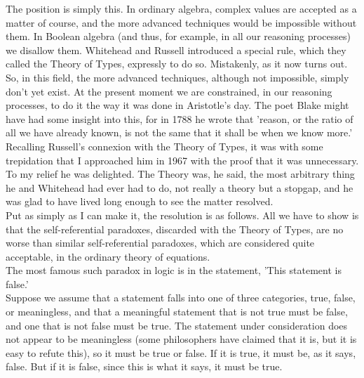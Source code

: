 \documentclass[a4paper]{article}
\theoremstyle{remark}
\begin{document}
The  position   is  simply  this.  In  ordinary   algebra,   complex   values  are  accepted  as  a  matter  of  course,  and  the  more  advanced   techniques   would   be   impossible   without   them.    In    Boolean  algebra  (and  thus,  for  example,  in  all  our  reasoning  processes)   we  disallow   them.   Whitehead   and   Russell   introduced  a  special  rule,  which  they  called  the  Theory  of  Types,  expressly  to  do  so.  Mistakenly,  as  it  now  turns  out.  So,  in  this  field,  the  more  advanced  techniques,  although  not  impossible,  simply  don't   yet  exist.  At  the  present   moment  we   are   constrained,  in  our  reasoning  processes,  to  do  it  the  way  it  was  done  in  Aristotle's  day.  The  poet  Blake  might  have  had  some  insight  into  this,  for  in  1788  he  wrote  that  'reason,  or  the  ratio  of  all  we  have  already  known,  is  not  the  same  that  it  shall  be  when  we  know  more.'\\

Recalling  Russell's  connexion  with  the  Theory  of  Types,  it was  with  some  trepidation   that   I  approached   him   in   1967   with  the  proof  that  it  was  unnecessary.  To  my  relief   he  was  delighted.  The  Theory  was,  he  said,  the  most  arbitrary  thing  he  and  Whitehead  had  ever  had  to  do,  not  really  a  theory  but  a  stopgap,  and  he  was  glad  to  have  lived  long  enough  to  see  the  matter  resolved.\\

Put  as  simply  as  I  can  make  it,  the  resolution  is  as  follows.  All  we  have  to  show  is that  the  self-referential  paradoxes,  discarded  with  the  Theory  of  Types,  are  no  worse  than   similar   self-referential   paradoxes,  which  are  considered  quite  acceptable,  in  the  ordinary  theory  of  equations.\\

The  most  famous  such  paradox  in  logic  is  in  the  statement,  
'This  statement  is  false.'  \\

Suppose  we  assume  that  a  statement  falls  into  one  of  three  categories,  true,  false,  or  meaningless,  and  that  a  meaningful  statement  that  is  not  true  must  be  false,  and  one  that  is  not  false   must  be  true.  The  statement   under   consideration   does   not  appear  to be meaningless  (some  philosophers  have  claimed  that  it  is,  but  it  is  easy  to  refute  this),  so  it  must  be  true  or  false.  If  it  is true,  it  must  be,  as  it  says,  false.  But  if  it  is  false,  since  this  is what  it  says,  it  must  be  true.\\
\end{document}
